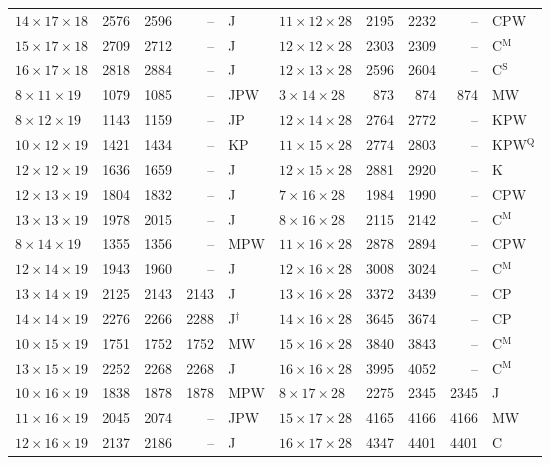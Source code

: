 \begin{longtable}{@{}lrrrl@{\hspace{6mm}}lrrrl@{}}
$14{\times}17{\times}18$ & 2576 & 2596 & -- & J & $11{\times}12{\times}28$ & 2195 & 2232 & -- & CPW\\
$15{\times}17{\times}18$ & 2709 & 2712 & -- & J & $12{\times}12{\times}28$ & 2303 & 2309 & -- & C$^{\mathrm{M}}$\\
$16{\times}17{\times}18$ & 2818 & 2884 & -- & J & $12{\times}13{\times}28$ & 2596 & 2604 & -- & C$^{\mathrm{S}}$\\
$8{\times}11{\times}19$ & 1079 & 1085 & -- & JPW & $3{\times}14{\times}28$ & 873 & 874 & 874 & MW\\
$8{\times}12{\times}19$ & 1143 & 1159 & -- & JP & $12{\times}14{\times}28$ & 2764 & 2772 & -- & KPW\\
$10{\times}12{\times}19$ & 1421 & 1434 & -- & KP & $11{\times}15{\times}28$ & 2774 & 2803 & -- & KPW$^{\mathrm{Q}}$\\
$12{\times}12{\times}19$ & 1636 & 1659 & -- & J & $12{\times}15{\times}28$ & 2881 & 2920 & -- & K\\
$12{\times}13{\times}19$ & 1804 & 1832 & -- & J & $7{\times}16{\times}28$ & 1984 & 1990 & -- & CPW\\
$13{\times}13{\times}19$ & 1978 & 2015 & -- & J & $8{\times}16{\times}28$ & 2115 & 2142 & -- & C$^{\mathrm{M}}$\\
$8{\times}14{\times}19$ & 1355 & 1356 & -- & MPW & $11{\times}16{\times}28$ & 2878 & 2894 & -- & CPW\\
$12{\times}14{\times}19$ & 1943 & 1960 & -- & J & $12{\times}16{\times}28$ & 3008 & 3024 & -- & C$^{\mathrm{M}}$\\
$13{\times}14{\times}19$ & 2125 & 2143 & 2143 & J & $13{\times}16{\times}28$ & 3372 & 3439 & -- & CP\\
$14{\times}14{\times}19$ & 2276 & 2266 & 2288 & J$^{\dagger}$ & $14{\times}16{\times}28$ & 3645 & 3674 & -- & CP\\
$10{\times}15{\times}19$ & 1751 & 1752 & 1752 & MW & $15{\times}16{\times}28$ & 3840 & 3843 & -- & C$^{\mathrm{M}}$\\
$13{\times}15{\times}19$ & 2252 & 2268 & 2268 & J & $16{\times}16{\times}28$ & 3995 & 4052 & -- & C$^{\mathrm{M}}$\\
$10{\times}16{\times}19$ & 1838 & 1878 & 1878 & MPW & $8{\times}17{\times}28$ & 2275 & 2345 & 2345 & J\\
$11{\times}16{\times}19$ & 2045 & 2074 & -- & JPW & $15{\times}17{\times}28$ & 4165 & 4166 & 4166 & MW\\
$12{\times}16{\times}19$ & 2137 & 2186 & -- & J & $16{\times}17{\times}28$ & 4347 & 4401 & 4401 & C\\

\end{longtable}
